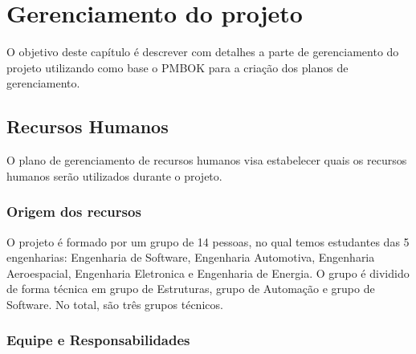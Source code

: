 \chapter{Gerenciamento do projeto}

O objetivo deste capítulo é descrever com detalhes a parte de gerenciamento do projeto utilizando como base o PMBOK \cite{pmbok} para a criação dos planos de gerenciamento.

\section{Recursos Humanos}

O plano de gerenciamento de recursos humanos visa estabelecer quais os recursos humanos serão utilizados durante o projeto.

\subsection{Origem dos recursos}

O projeto é formado por um grupo de 14 pessoas, no qual temos estudantes das 5 engenharias: Engenharia de Software, Engenharia Automotiva, Engenharia Aeroespacial, Engenharia Eletronica e Engenharia de Energia. O grupo é dividido de forma técnica em grupo de Estruturas, grupo de Automação e grupo de Software. No total, são três grupos técnicos.

\subsection{Equipe e Responsabilidades}

